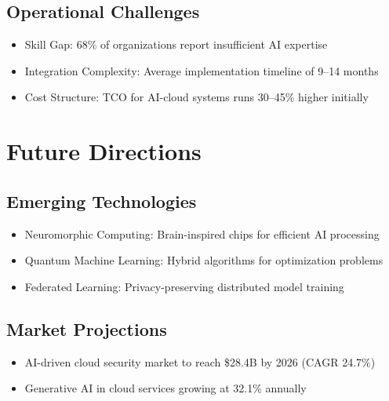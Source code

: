 \documentclass[a4paper,12pt]{article}
\begin{document}
\subsection{Operational Challenges}
\begin{itemize}
    \item Skill Gap: 68\% of organizations report insufficient AI expertise
    \item Integration Complexity: Average implementation timeline of 9--14 months
    \item Cost Structure: TCO for AI-cloud systems runs 30--45\% higher initially
\end{itemize}

\section{Future Directions}
\subsection{Emerging Technologies}
\begin{itemize}
    \item Neuromorphic Computing: Brain-inspired chips for efficient AI processing
    \item Quantum Machine Learning: Hybrid algorithms for optimization problems
    \item Federated Learning: Privacy-preserving distributed model training
\end{itemize}

\subsection{Market Projections}
\begin{itemize}
    \item AI-driven cloud security market to reach \$28.4B by 2026 (CAGR 24.7\%)
    \item Generative AI in cloud services growing at 32.1\% annually
\end{itemize}
\end{document}
